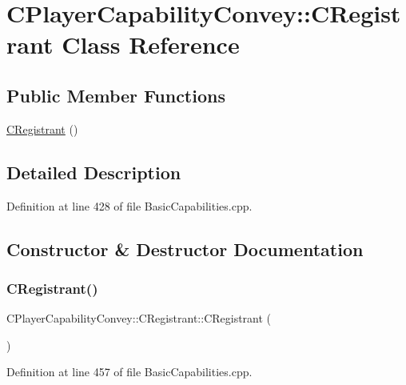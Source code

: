 \hypertarget{classCPlayerCapabilityConvey_1_1CRegistrant}{}\section{C\+Player\+Capability\+Convey\+:\+:C\+Registrant Class Reference}
\label{classCPlayerCapabilityConvey_1_1CRegistrant}
\subsection*{Public Member Functions}
\begin{DoxyCompactItemize}
\item 
\hyperlink{classCPlayerCapabilityConvey_1_1CRegistrant_a7ceb41f660b3b73dff670952658a2883}{C\+Registrant} ()
\end{DoxyCompactItemize}


\subsection{Detailed Description}


Definition at line 428 of file Basic\+Capabilities.\+cpp.



\subsection{Constructor \& Destructor Documentation}
\hypertarget{classCPlayerCapabilityConvey_1_1CRegistrant_a7ceb41f660b3b73dff670952658a2883}{}\label{classCPlayerCapabilityConvey_1_1CRegistrant_a7ceb41f660b3b73dff670952658a2883} 
\subsubsection{\texorpdfstring{C\+Registrant()}{CRegistrant()}}
{\footnotesize\ttfamily C\+Player\+Capability\+Convey\+::\+C\+Registrant\+::\+C\+Registrant (\begin{DoxyParamCaption}{ }\end{DoxyParamCaption})}



Definition at line 457 of file Basic\+Capabilities.\+cpp.



